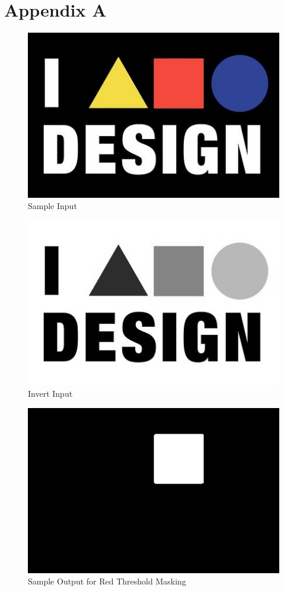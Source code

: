 \section{Appendix A}\label{sec:vision_appendix_A}

\begin{figure}[h]
	\includegraphics[scale=0.5]{./figure/normal.jpg}
	\caption{Sample Input}
	\label{fig:normal output}
\end{figure}

\begin{figure}[h]
	\includegraphics[scale=0.5]{./figure/negative.jpg}
	\caption{Invert Input}
	\label{fig:Invert output}
\end{figure}

\begin{figure}[h]
	\includegraphics[scale=0.45]{./figure/mask.jpg}
	\caption{Sample Output for Red Threshold Masking}
	\label{fig:masking output}
\end{figure}

